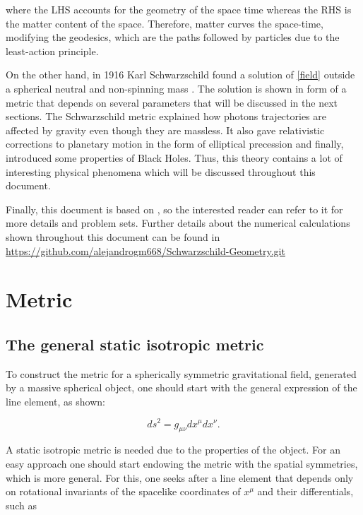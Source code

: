 \documentclass[letterpaper,11pt,onecolumn]{article}
\begin{document}
where the LHS accounts for the geometry of the space time whereas the RHS is the matter content of the space. Therefore, matter curves the space-time, modifying the geodesics, which are the paths followed by particles due to the least-action principle. 

On the other hand, in 1916 Karl Schwarzschild found a solution of \ref{field} outside a spherical neutral and non-spinning mass \cite{1916SPAW.......189S}. The solution is shown in form of a metric that depends on several parameters that will be discussed in the next sections. The Schwarzschild metric explained how photons trajectories are affected by gravity even though they are massless. It also gave relativistic corrections to planetary motion in the form of elliptical precession and finally, introduced some properties of Black Holes. Thus, this theory contains a lot of interesting physical phenomena which will be discussed throughout this document. 

Finally, this document is based on \cite{hobson_efstathiou_lasenby_2006}, so the interested reader can refer to it for more details and problem sets. Further details about the numerical calculations shown throughout this document can be found in \url{https://github.com/alejandrogm668/Schwarzschild-Geometry.git}

\section{Metric}\label{metric}

\subsection{The general static isotropic metric}

To construct the metric for a spherically symmetric gravitational field, generated by a massive spherical object, one should start with the general expression of the line element, as shown:

\begin{equation}
d s^{2}=g_{\mu \nu} d x^{\mu} d x^{\nu}\label{lineelement}.
\end{equation}

A static isotropic metric is needed due to the properties of the object. For an easy approach one should start endowing the metric with the spatial symmetries, which is more general. For this, one seeks after a line element that depends only on rotational invariants of the spacelike coordinates of $x^\mu$ and their differentials, such as
\end{document}
